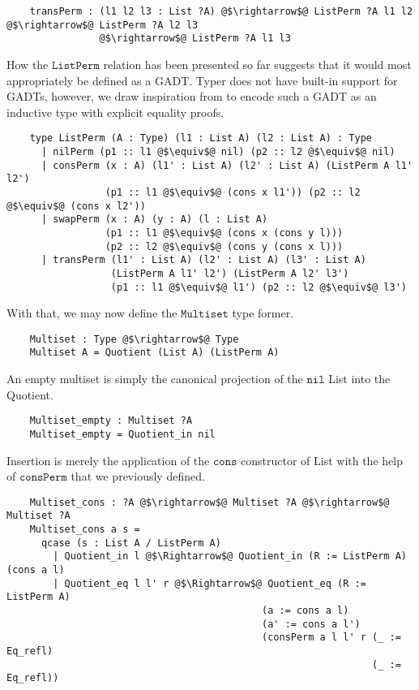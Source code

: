 \documentclass[12pt,twoside,maitrise]{dms}
\theoremstyle{definition}
\numberwithin{equation}{section}
\numberwithin{table}{chapter}
\numberwithin{figure}{chapter}
\newcommand\fn[1] {\texttt{#1}}
\begin{document}
\begin{verbatim}
    transPerm : (l1 l2 l3 : List ?A) @$\rightarrow$@ ListPerm ?A l1 l2 @$\rightarrow$@ ListPerm ?A l2 l3
                @$\rightarrow$@ ListPerm ?A l1 l3
\end{verbatim}

How the $\fn{ListPerm}$ relation has been presented so far suggests that it
would most appropriately be defined as a GADT\@. Typer does not have built-in
support for GADTs, however, we draw inspiration from\cite{sulzmann2007systemfeq}
to encode such a GADT as an inductive type with explicit equality proofs.

\begin{verbatim}
    type ListPerm (A : Type) (l1 : List A) (l2 : List A) : Type
      | nilPerm (p1 :: l1 @$\equiv$@ nil) (p2 :: l2 @$\equiv$@ nil)
      | consPerm (x : A) (l1' : List A) (l2' : List A) (ListPerm A l1' l2')
                 (p1 :: l1 @$\equiv$@ (cons x l1')) (p2 :: l2 @$\equiv$@ (cons x l2'))
      | swapPerm (x : A) (y : A) (l : List A)
                 (p1 :: l1 @$\equiv$@ (cons x (cons y l)))
                 (p2 :: l2 @$\equiv$@ (cons y (cons x l)))
      | transPerm (l1' : List A) (l2' : List A) (l3' : List A)
                  (ListPerm A l1' l2') (ListPerm A l2' l3')
                  (p1 :: l1 @$\equiv$@ l1') (p2 :: l2 @$\equiv$@ l3')
\end{verbatim}

With that, we may now define the $\fn{Multiset}$ type former.

\begin{verbatim}
    Multiset : Type @$\rightarrow$@ Type
    Multiset A = Quotient (List A) (ListPerm A)
\end{verbatim}

An empty multiset is simply the canonical projection of the $\fn{nil}$ List into
the Quotient.

\begin{verbatim}
    Multiset_empty : Multiset ?A
    Multiset_empty = Quotient_in nil
\end{verbatim}

Insertion is merely the application of the $\fn{cons}$ constructor of List with the help
of $\fn{consPerm}$ that we previously defined.

\begin{verbatim}
    Multiset_cons : ?A @$\rightarrow$@ Multiset ?A @$\rightarrow$@ Multiset ?A
    Multiset_cons a s =
      qcase (s : List A / ListPerm A)
        | Quotient_in l @$\Rightarrow$@ Quotient_in (R := ListPerm A) (cons a l)
        | Quotient_eq l l' r @$\Rightarrow$@ Quotient_eq (R := ListPerm A)
                                            (a := cons a l)
                                            (a' := cons a l')
                                            (consPerm a l l' r (_ := Eq_refl)
                                                               (_ := Eq_refl))
\end{verbatim}
\end{document}
